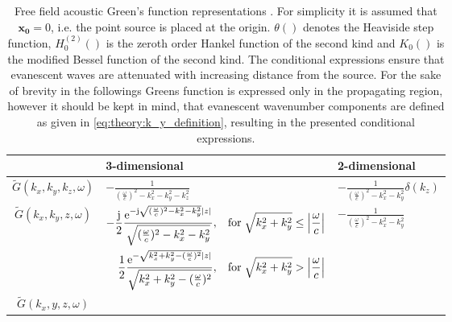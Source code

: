 \begin{table}
\caption{Free field acoustic Green's function representations \cite{Devaney2012, Duffy2001:Greens, Ahrens2010a, Ahrens2012, Gibson2008}.
For simplicity it is assumed that $\mathbf{x_0} = 0$, i.e. the point source is placed at the origin.
$\theta\left( \right)$ denotes the Heaviside step function, $H_0^{(2)}\left( \right)$ is the zeroth order Hankel function of the second kind and $K_0
\left( \right)$ is the modified Bessel function of the second kind.
The conditional expressions ensure that evanescent waves are attenuated with increasing distance from the source. For the sake of brevity in the followings Greens function is expressed only in the propagating region, however it should be kept in mind, that evanescent wavenumber components are defined as given in \eqref{eq:theory:k_y_definition}, resulting in the presented conditional expressions.
}
\label{tab:theory:Greens_fun_representations} 
    \begin{tabular}{  c | | l |	 l }%
      & 3-dimensional & 2-dimensional \\ \hline
    $\tilde{G}(k_x,k_y,k_z,\omega)$ & $-\frac{1}{ \left(\frac{\omega}{c}\right)^2 - k_x^2-k_y^2-k_z^2} $ &  $-\frac{1}{\left(\frac{\omega}{c}\right)^2 - k_x^2-k_y^2}\delta(k_z)$ \\ 
    $\tilde{G}(k_x,k_y,z,\omega)$   &  
    \scriptsize	$\begin{aligned}[t]
	-\frac{\mathrm{j}}{2}\frac{\mathrm{e}^{-\mathrm{j}\sqrt{(\frac{\omega}{c})^2 - k_x^2 - k_y^2}|z|}}{\sqrt{(\frac{\omega}{c})^2 - k_x^2 - k_y^2}},\hspace{3mm} \text{for} \hspace{1mm}
	\sqrt{k_x^2+k_y^2}	\leq\left| \frac{\omega}{c} \right| \\
	\frac{1}{2}\frac{\mathrm{e}^{-\sqrt{k_x^2 + k_y^2-(\frac{\omega}{c})^2}|z|}}{\sqrt{k_x^2 + k_y^2-(\frac{\omega}{c})^2}},\hspace{3mm}  \text{for} \hspace{1mm}				\sqrt{k_x^2+k_y^2}>\left| 	\frac{\omega}{c} \right| 
	\end{aligned}$ \normalsize    
    &
	$-\frac{1}{\left(\frac{\omega}{c}\right)^2 - k_x^2-k_y^2}$
	\\
    $\tilde{G}(k_x,y,z,\omega)$

\end{tabular}
\end{table}
